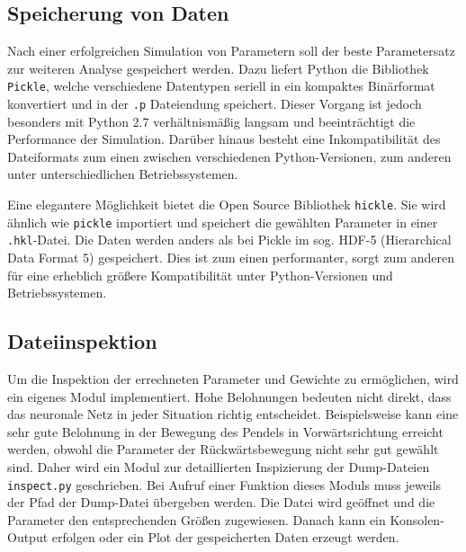 	\subsection{Speicherung von Daten}
		Nach einer erfolgreichen Simulation von Parametern soll der beste Parametersatz zur weiteren Analyse gespeichert werden. Dazu liefert Python die Bibliothek \texttt{Pickle}, welche verschiedene Datentypen seriell in ein kompaktes Binärformat konvertiert und in der \texttt{.p} Dateiendung speichert. Dieser Vorgang ist jedoch besonders mit Python 2.7 verhältnismäßig langsam und beeinträchtigt die Performance der Simulation. Darüber hinaus besteht eine Inkompatibilität des Dateiformats zum einen zwischen verschiedenen Python-Versionen, zum anderen unter unterschiedlichen Betriebssystemen.
		
		Eine elegantere Möglichkeit bietet die Open Source Bibliothek \texttt{hickle}. Sie wird ähnlich wie \texttt{pickle} importiert und speichert die gewählten Parameter in einer \texttt{.hkl}-Datei. Die Daten werden anders als bei Pickle im sog. HDF-5 (Hierarchical Data Format 5) \cite{hdf5} gespeichert. Dies ist zum einen performanter, sorgt zum anderen für eine erheblich größere Kompatibilität unter Python-Versionen und Betriebssystemen.
	\subsection{Dateiinspektion}
		Um die Inspektion der errechneten Parameter und Gewichte zu ermöglichen, wird ein eigenes Modul implementiert. Hohe Belohnungen bedeuten nicht direkt, dass das neuronale Netz in jeder Situation richtig entscheidet. Beispielsweise kann eine sehr gute Belohnung in der Bewegung des Pendels in Vorwärtsrichtung erreicht werden, obwohl die Parameter der Rückwärtsbewegung nicht sehr gut gewählt sind. Daher wird ein Modul zur detaillierten Inspizierung der Dump-Dateien \texttt{inspect.py} geschrieben. Bei Aufruf einer Funktion dieses Moduls muss jeweils der Pfad der Dump-Datei übergeben werden. Die Datei wird geöffnet und die Parameter den entsprechenden Größen zugewiesen. Danach kann ein Konsolen-Output erfolgen oder ein Plot der gespeicherten Daten erzeugt werden.


